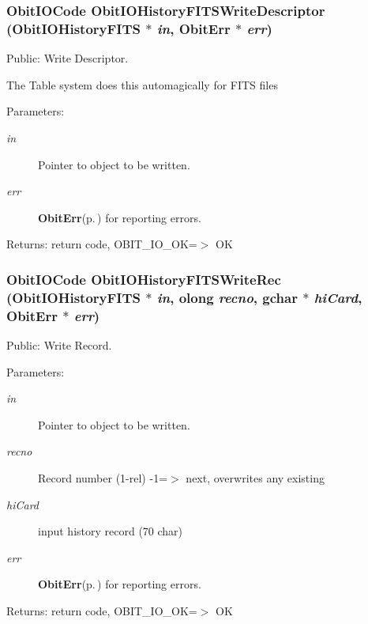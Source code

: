 \subsubsection{\setlength{\rightskip}{0pt plus 5cm}Obit\-IOCode Obit\-IOHistory\-FITSWrite\-Descriptor ({\bf Obit\-IOHistory\-FITS} $\ast$ {\em in}, {\bf Obit\-Err} $\ast$ {\em err})}\label{ObitIOHistoryFITS_8c_a19}


Public: Write Descriptor. 

The Table system does this automagically for FITS files \begin{Desc}
\item[Parameters:]
\begin{description}
\item[{\em in}]Pointer to object to be written. \item[{\em err}]{\bf Obit\-Err}{\rm (p.\,\pageref{structObitErr})} for reporting errors. \end{description}
\end{Desc}
\begin{Desc}
\item[Returns:]return code, OBIT\_\-IO\_\-OK=$>$ OK \end{Desc}
\subsubsection{\setlength{\rightskip}{0pt plus 5cm}Obit\-IOCode Obit\-IOHistory\-FITSWrite\-Rec ({\bf Obit\-IOHistory\-FITS} $\ast$ {\em in}, {\bf olong} {\em recno}, gchar $\ast$ {\em hi\-Card}, {\bf Obit\-Err} $\ast$ {\em err})}\label{ObitIOHistoryFITS_8c_a16}


Public: Write Record. 

\begin{Desc}
\item[Parameters:]
\begin{description}
\item[{\em in}]Pointer to object to be written. \item[{\em recno}]Record number (1-rel) -1=$>$ next, overwrites any existing \item[{\em hi\-Card}]input history record (70 char) \item[{\em err}]{\bf Obit\-Err}{\rm (p.\,\pageref{structObitErr})} for reporting errors. \end{description}
\end{Desc}
\begin{Desc}
\item[Returns:]return code, OBIT\_\-IO\_\-OK=$>$ OK \end{Desc}
